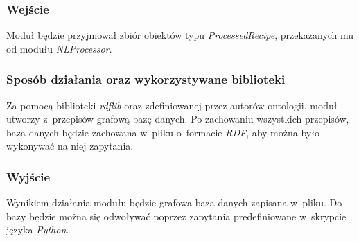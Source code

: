\documentclass[11pt,a4paper]{article}
\begin{document}
\subsubsection{Wejście}
Moduł będzie przyjmował zbiór obiektów typu \textit{ProcessedRecipe}, przekazanych mu od modułu \textit{NLProcessor}.
\subsubsection{Sposób działania oraz wykorzystywane biblioteki}
Za pomocą biblioteki \textit{rdflib} oraz zdefiniowanej przez autorów ontologii, moduł utworzy z~przepisów grafową bazę danych. Po zachowaniu wszystkich przepisów, baza danych będzie zachowana w~pliku o~formacie \textit{RDF}, aby można było wykonywać na niej zapytania.
\subsubsection{Wyjście}
Wynikiem działania modułu będzie grafowa baza danych zapisana w~pliku. Do bazy będzie można się odwoływać poprzez zapytania predefiniowane w~skrypcie języka \textit{Python}.
\end{document}
